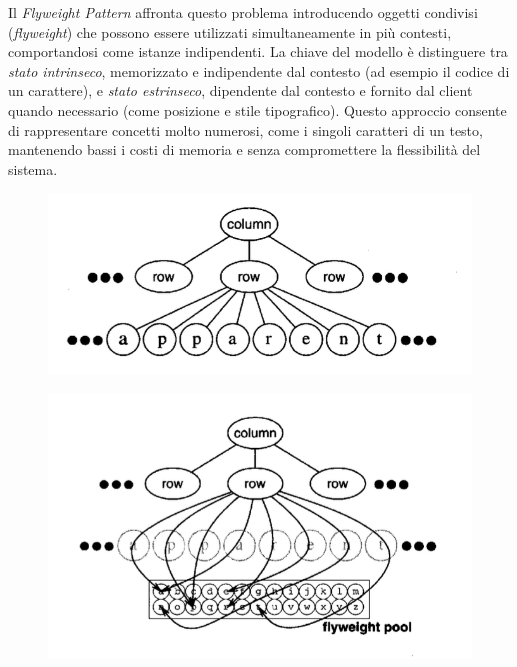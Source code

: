 Il \emph{Flyweight Pattern} affronta questo problema introducendo oggetti condivisi (\emph{flyweight}) che possono essere utilizzati simultaneamente in più contesti, comportandosi come istanze indipendenti. La chiave del modello è distinguere tra \emph{stato intrinseco}, memorizzato e indipendente dal contesto (ad esempio il codice di un carattere), e \emph{stato estrinseco}, dipendente dal contesto e fornito dal client quando necessario (come posizione e stile tipografico). Questo approccio consente di rappresentare concetti molto numerosi, come i singoli caratteri di un testo, mantenendo bassi i costi di memoria e senza compromettere la flessibilità del sistema.

\begin{multicols}{2}
\begin{figure}[H]
    \centering
    \includegraphics[width=1\linewidth]{assets/pattern/flyweight/flyweight-soluzione-1.png}
\end{figure}
\columnbreak
\begin{figure}[H]
    \centering
    \includegraphics[width=1\linewidth]{assets/pattern/flyweight/flyweight-soluzione-2.png}
\end{figure}
\end{multicols}

